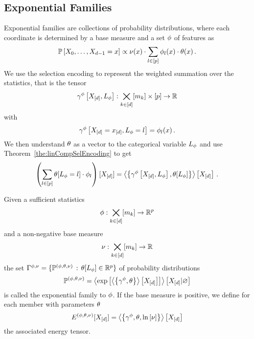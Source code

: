 \subsection{Exponential Families}\label{sec:exponentialFamilies}



Exponential families are collections of probability distributions, where each coordinate is determined by a base measure and a set $\phi$ of features as
	\[ \mathbb{P}\left[X_{0},\ldots,X_{d-1}=x\right]  \propto \nu(x) \cdot \sum_{l\in[p]} \phi_l(x) \cdot \theta(x) \, . \]
We use the selection encoding to represent the weighted summation over the statistics, that is the tensor
	\[ \gamma^{\phi}\left[X_{[d]},L_{\phi}\right]: \bigtimes_{k\in[d]}[m_{k}] \times [p] \rightarrow \mathbb{R} \]
with
	\[ \gamma^{\phi}\left[X_{[d]}=x_{[d]},L_{\phi}=l\right] = \phi_l(x) \, . \]
We then understand $\theta$ as a vector to the categorical variable $L_{\phi}$ and use Theorem~\ref{the:linCompSelEncoding} to get
	\[ \left(\sum_{l\in[p]}\theta[L_{\phi}=l]\cdot \phi_l \right) [X_{[d]}] 
		 = \left\langle \left\{\gamma^{\phi}\left[X_{[d]},L_{\phi}\right] , \theta[L_{\phi}]\right\}\right\rangle \left[ X_{[d]} \right] \, . \]

	



\begin{definition}
	Given a sufficient statistics 
		\[ \phi : \bigtimes_{k\in[d]}[m_{k}] \rightarrow \mathbb{R}^p\]
	and a non-negative base measure
		\[ \nu : \bigtimes_{k\in[d]}[m_{k}] \rightarrow \mathbb{R} \]
	the set $\Gamma^{\phi,\nu}=\{\mathbb{P}^{(\phi,\theta,\nu)} \, : \, \theta[L_{\phi}] \in \mathbb{R}^{p}\}$ of probability distributions 
		\[ \mathbb{P}^{(\phi,\theta,\nu)} = \left\langle \mathrm{exp}\left[\left\langle \left\{\gamma^{\phi},\theta\right\}\right\rangle \left[ X_{[d]} \right]\right]\right\rangle \left[ X_{[d]} | \varnothing \right] \]
	is called the exponential family to $\phi$.
	If the base measure is positive, we define for each member with parameters $\theta$
		\[ E^{(\phi,\theta,\nu)}[X_{[d]}] = \left\langle \left\{\gamma^{\phi},\theta,\ln \left[ \nu \right]\right\}\right\rangle \left[ X_{[d]} \right] \]
	the associated energy tensor.
\end{definition}






